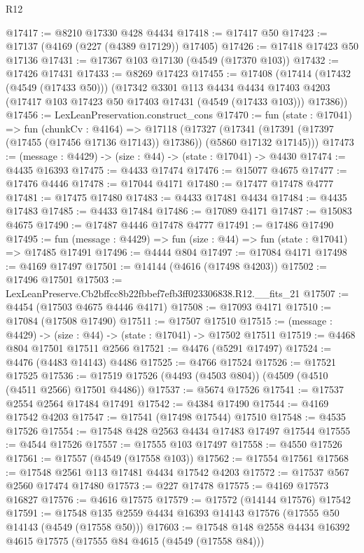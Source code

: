 \begin{lexlean}{R12}
\begin{coremodule}
@17417 := @8210 @17330 @428 @4434
@17418 := @17417 @50
@17423 := @17137 (@4169 (@227 (@4389 @17129)) @17405)
@17426 := @17418 @17423 @50 @17136
@17431 := @17367 @103 @17130 (@4549 (@17370 @103))
@17432 := @17426 @17431
@17433 := @8269 @17423
@17455 := @17408
    (@17414
      (@17432 (@4549 (@17433 @50)))
      (@17342
        @3301
        @113
        @4434
        @4434
        @17403
        @4203
        (@17417 @103 @17423 @50 @17403 @17431 (@4549 (@17433 @103)))
        @17386))
@17456 := LexLeanPreservation.construct_cons
@17470 := fun (state : @17041) =>
  fun (chunkCv : @4164) =>
  @17118
    (@17327 (@17341 (@17391 (@17397 (@17455 (@17456 @17136 @17143)) @17386)) (@5860 @17132 @17145)))
@17473 := (message : @4429) -> (size : @44) -> (state : @17041) -> @4430
@17474 := @4435 @16393
@17475 := @4433 @17474
@17476 := @15077 @4675
@17477 := @17476 @4446
@17478 := @17044 @4171
@17480 := @17477 @17478 @4777
@17481 := @17475 @17480
@17483 := @4433 @17481 @4434
@17484 := @4435 @17483
@17485 := @4433 @17484
@17486 := @17089 @4171
@17487 := @15083 @4675
@17490 := @17487 @4446 @17478 @4777
@17491 := @17486 @17490
@17495 := fun (message : @4429) => fun (size : @44) => fun (state : @17041) => @17485 @17491
@17496 := @4444 @804
@17497 := @17084 @4171
@17498 := @4169 @17497
@17501 := @14144 (@4616 (@17498 @4203))
@17502 := @17496 @17501
@17503 := LexLeanPreserve.Cb2bffcc8b22fbbef7efb3ff023306838.R12.__fits_21
@17507 := @4454 (@17503 @4675 @4446 @4171)
@17508 := @17093 @4171
@17510 := @17084 (@17508 @17490)
@17511 := @17507 @17510
@17515 := (message : @4429) -> (size : @44) -> (state : @17041) -> @17502 @17511
@17519 := @4468 @804 @17501 @17511 @2566
@17521 := @4476 (@5291 @17497)
@17524 := @4476 (@4483 @14143) @4486
@17525 := @4766 @17524
@17526 := @17521 @17525
@17536 := @17519 @17526 (@4493 (@4503 @804)) (@4509 (@4510 (@4511 @2566) @17501 @4486))
@17537 := @5674 @17526
@17541 := @17537 @2554 @2564 @17484 @17491
@17542 := @4384 @17490
@17544 := @4169 @17542 @4203
@17547 := @17541 (@17498 @17544) @17510
@17548 := @4535 @17526
@17554 := @17548 @428 @2563 @4434 @17483 @17497 @17544
@17555 := @4544 @17526
@17557 := @17555 @103 @17497
@17558 := @4550 @17526
@17561 := @17557 (@4549 (@17558 @103))
@17562 := @17554 @17561
@17568 := @17548 @2561 @113 @17481 @4434 @17542 @4203
@17572 := @17537 @567 @2560 @17474 @17480
@17573 := @227 @17478
@17575 := @4169 @17573 @16827
@17576 := @4616 @17575
@17579 := @17572 (@14144 @17576) @17542
@17591 := @17548 @135 @2559 @4434 @16393 @14143 @17576 (@17555 @50 @14143 (@4549 (@17558 @50)))
@17603 := @17548 @148 @2558 @4434 @16392 @4615 @17575 (@17555 @84 @4615 (@4549 (@17558 @84)))

\end{coremodule}
\end{lexlean}
